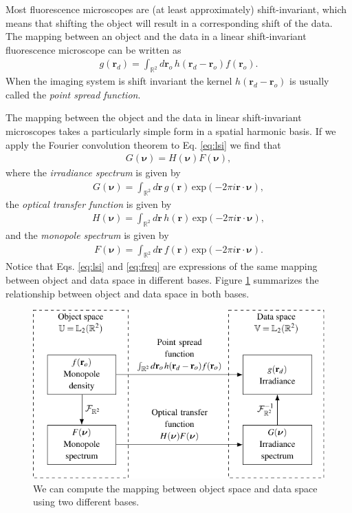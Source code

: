 \documentclass{osa-article}
\providecommand{\mb}[1]{\mathbf{#1}}
\providecommand{\ro}{\mathbf{\mathbf{r}}_o}
\providecommand{\rd}{\mathbf{r}_d}
\providecommand{\mbb}[1]{\mathbb{#1}}
\providecommand{\bs}[1]{\boldsymbol{#1}}
\begin{document}
Most fluorescence microscopes are (at least approximately) shift-invariant,
which means that shifting the object will result in a corresponding shift of the
data. The mapping between an object and the data in a linear shift-invariant
fluorescence microscope can be written as
\begin{align}
  g(\rd) = \int_{\mbb{R}^2}d\ro\, h(\rd - \ro)f(\ro).  \label{eq:lsi}
\end{align}
When the imaging system is shift invariant the kernel $h(\rd - \ro)$ is usually
called the \textit{point spread function}.

The mapping between the object and the data in linear shift-invariant
microscopes takes a particularly simple form in a spatial harmonic basis. If we
apply the Fourier convolution theorem to Eq. \ref{eq:lsi} we find that
\begin{align}
  G(\bs{\nu}) = H(\bs{\nu})F(\bs{\nu}),\label{eq:freq}
\end{align}
where the \textit{irradiance spectrum} is given by
\begin{align}
  G(\bs{\nu}) = \int_{\mbb{R}^2}d\mb{r}\, g(\mb{r})\, \text{exp}(-2\pi i\mb{r}\cdot\bs{\nu}),
\end{align}
the \textit{optical transfer function} is given by
\begin{align}
  H(\bs{\nu}) = \int_{\mbb{R}^2}d\mb{r}\, h(\mb{r})\, \text{exp}(-2\pi i\mb{r}\cdot\bs{\nu}),
\end{align}
and the \textit{monopole spectrum} is given by
\begin{align}
    F(\bs{\nu}) = \int_{\mbb{R}^2}d\mb{r}\, f(\mb{r})\, \text{exp}(-2\pi i\mb{r}\cdot\bs{\nu}).
\end{align}
Notice that Eqs. \ref{eq:lsi} and \ref{eq:freq} are expressions of the same
mapping between object and data space in different bases. Figure
\ref{fig:monopole-block} summarizes the relationship between object and data
space in both bases.

\begin{figure}
  \centering
  \includegraphics[scale=1.0]{../figures/monopole-block/monopole-block.pdf}
  \caption{We can compute the mapping between object space and data space using
    two different bases.}
     \label{fig:monopole-block}      
\end{figure}
\end{document}
